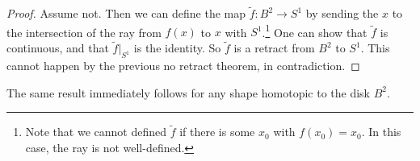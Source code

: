 \begin{proof}
  Assume not. Then we can define the
  map $\widetilde{f} : B^2 \to S^1$ by sending
  the $x$ to the intersection of the ray from
  $f(x)$ to $x$ with $S^1$.\footnote{Note that we cannot defined $\widetilde{f}$ if there is some $x_0$ with $f(x_0) = x_0$. In this case, the ray is not well-defined.} One can show that
  $\widetilde{f}$ is continuous, and that
  $\widetilde{f}|_{S^1}$ is the identity. So
  $\widetilde{f}$ is a retract from $B^2$ to $S^1$.
  This cannot happen by the previous no retract
  theorem, in contradiction.
\end{proof}

\begin{remark}
  The same result immediately follows for any
  shape homotopic to the disk $B^2$.
\end{remark}
